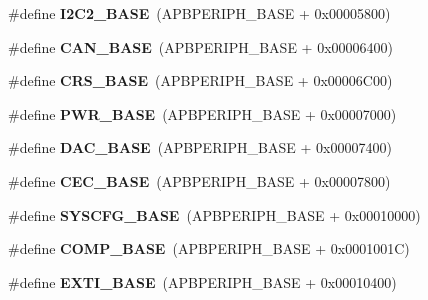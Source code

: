 \begin{DoxyCompactItemize}
\#define {\bfseries I2\+C2\+\_\+\+B\+A\+SE}~(A\+P\+B\+P\+E\+R\+I\+P\+H\+\_\+\+B\+A\+SE + 0x00005800)
\item 
\mbox{\label{group___peripheral__memory__map_gacbe030cda8eb3031d55a759612a9042d}} 
\#define {\bfseries C\+A\+N\+\_\+\+B\+A\+SE}~(A\+P\+B\+P\+E\+R\+I\+P\+H\+\_\+\+B\+A\+SE + 0x00006400)
\item 
\mbox{\label{group___peripheral__memory__map_ga53cd25310ec0663a7395042bd860fedc}} 
\#define {\bfseries C\+R\+S\+\_\+\+B\+A\+SE}~(A\+P\+B\+P\+E\+R\+I\+P\+H\+\_\+\+B\+A\+SE + 0x00006\+C00)
\item 
\mbox{\label{group___peripheral__memory__map_gac691ec23dace8b7a649a25acb110217a}} 
\#define {\bfseries P\+W\+R\+\_\+\+B\+A\+SE}~(A\+P\+B\+P\+E\+R\+I\+P\+H\+\_\+\+B\+A\+SE + 0x00007000)
\item 
\mbox{\label{group___peripheral__memory__map_gad18d0b914c7f68cecbee1a2d23a67d38}} 
\#define {\bfseries D\+A\+C\+\_\+\+B\+A\+SE}~(A\+P\+B\+P\+E\+R\+I\+P\+H\+\_\+\+B\+A\+SE + 0x00007400)
\item 
\mbox{\label{group___peripheral__memory__map_gaacb77bc44b3f8c87ab98f241e760e440}} 
\#define {\bfseries C\+E\+C\+\_\+\+B\+A\+SE}~(A\+P\+B\+P\+E\+R\+I\+P\+H\+\_\+\+B\+A\+SE + 0x00007800)
\item 
\mbox{\label{group___peripheral__memory__map_ga62246020bf3b34b6a4d8d0e84ec79d3d}} 
\#define {\bfseries S\+Y\+S\+C\+F\+G\+\_\+\+B\+A\+SE}~(A\+P\+B\+P\+E\+R\+I\+P\+H\+\_\+\+B\+A\+SE + 0x00010000)
\item 
\mbox{\label{group___peripheral__memory__map_gaa9f5d2999c6918e385d7a526c4f6b1d3}} 
\#define {\bfseries C\+O\+M\+P\+\_\+\+B\+A\+SE}~(A\+P\+B\+P\+E\+R\+I\+P\+H\+\_\+\+B\+A\+SE + 0x0001001\+C)
\item 
\mbox{\label{group___peripheral__memory__map_ga87371508b3bcdcd98cd1ec629be29061}} 
\#define {\bfseries E\+X\+T\+I\+\_\+\+B\+A\+SE}~(A\+P\+B\+P\+E\+R\+I\+P\+H\+\_\+\+B\+A\+SE + 0x00010400)

\end{DoxyCompactItemize}
